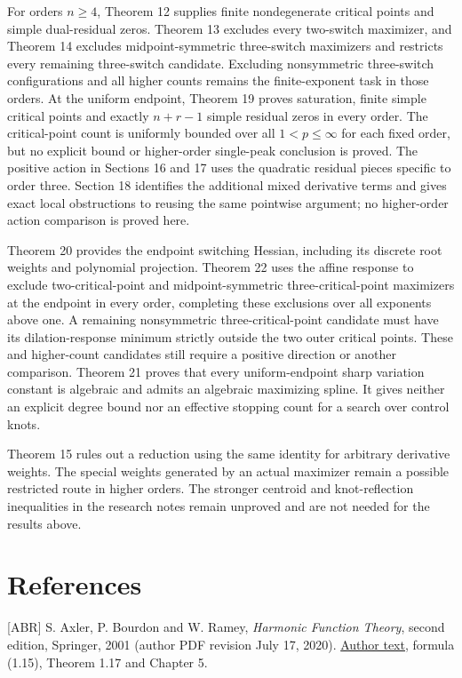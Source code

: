 \documentclass[11pt]{article}
\begin{document}
For orders \(n\ge4\), Theorem 12 supplies finite nondegenerate critical
points and simple dual-residual zeros. Theorem 13 excludes every
two-switch maximizer, and Theorem 14 excludes midpoint-symmetric
three-switch maximizers and restricts every remaining three-switch
candidate. Excluding nonsymmetric three-switch configurations and all
higher counts remains the finite-exponent task in those orders. At the
uniform endpoint, Theorem 19 proves saturation, finite simple critical
points and exactly \(n+r-1\) simple residual zeros in every order. The
critical-point count is uniformly bounded over all \(1<p\le\infty\) for
each fixed order, but no explicit bound or higher-order single-peak
conclusion is proved. The positive action in Sections 16 and 17 uses the
quadratic residual pieces specific to order three. Section 18 identifies
the additional mixed derivative terms and gives exact local obstructions
to reusing the same pointwise argument; no higher-order action
comparison is proved here.

Theorem 20 provides the endpoint switching Hessian, including its
discrete root weights and polynomial projection. Theorem 22 uses the
affine response to exclude two-critical-point and midpoint-symmetric
three-critical-point maximizers at the endpoint in every order,
completing these exclusions over all exponents above one. A remaining
nonsymmetric three-critical-point candidate must have its
dilation-response minimum strictly outside the two outer critical
points. These and higher-count candidates still require a positive
direction or another comparison. Theorem 21 proves that every
uniform-endpoint sharp variation constant is algebraic and admits an
algebraic maximizing spline. It gives neither an explicit degree bound
nor an effective stopping count for a search over control knots.

Theorem 15 rules out a reduction using the same identity for arbitrary
derivative weights. The special weights generated by an actual maximizer
remain a possible restricted route in higher orders. The stronger
centroid and knot-reflection inequalities in the research notes remain
unproved and are not needed for the results above.

\clearpage\raggedright{}\section{References}\label{references}

{[}ABR{]} S. Axler, P. Bourdon and W. Ramey, \emph{Harmonic Function
Theory}, second edition, Springer, 2001 (author PDF revision July 17,
2020). \href{https://axler.net/HFT.pdf}{Author text}, formula (1.15),
Theorem 1.17 and Chapter 5.
\end{document}
